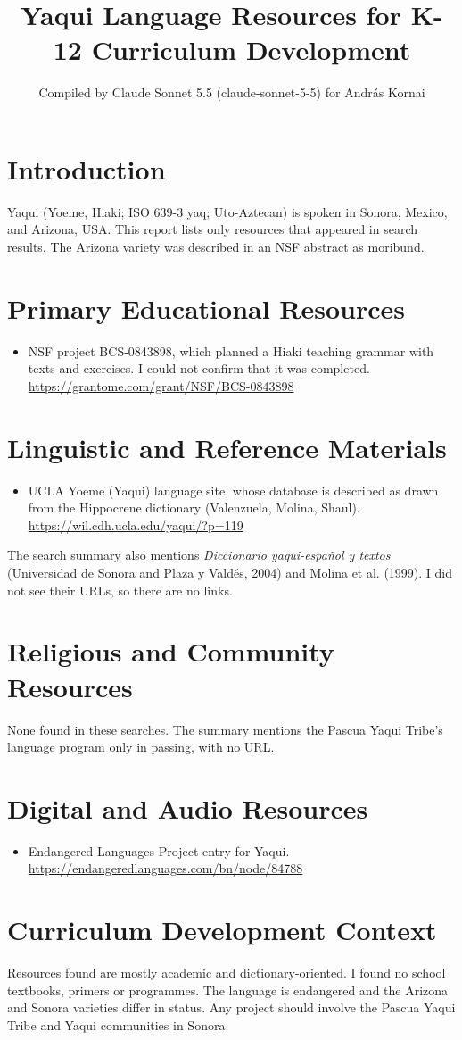 \documentclass[12pt]{article}
\title{Yaqui Language Resources for K-12 Curriculum Development}
\author{Compiled by Claude Sonnet 5.5 (claude-sonnet-5-5) for Andr\'as Kornai}
\date{}
\begin{document}
\maketitle

\section{Introduction}
Yaqui (Yoeme, Hiaki; ISO 639-3 yaq; Uto-Aztecan) is spoken in Sonora, Mexico, and Arizona, USA. This report lists only resources that appeared in search results. The Arizona variety was described in an NSF abstract as moribund.

\section{Primary Educational Resources}
\begin{itemize}
\item NSF project BCS-0843898, which planned a Hiaki teaching grammar with texts and exercises. I could not confirm that it was completed. \url{https://grantome.com/grant/NSF/BCS-0843898}
\end{itemize}

\section{Linguistic and Reference Materials}
\begin{itemize}
\item UCLA Yoeme (Yaqui) language site, whose database is described as drawn from the Hippocrene dictionary (Valenzuela, Molina, Shaul). \url{https://wil.cdh.ucla.edu/yaqui/?p=119}
\end{itemize}
The search summary also mentions \emph{Diccionario yaqui-espa\~nol y textos} (Universidad de Sonora and Plaza y Valdés, 2004) and Molina et al. (1999). I did not see their URLs, so there are no links.

\section{Religious and Community Resources}
None found in these searches. The summary mentions the Pascua Yaqui Tribe's language program only in passing, with no URL.

\section{Digital and Audio Resources}
\begin{itemize}
\item Endangered Languages Project entry for Yaqui. \url{https://endangeredlanguages.com/bn/node/84788}
\end{itemize}

\section{Curriculum Development Context}
Resources found are mostly academic and dictionary-oriented. I found no school textbooks, primers or programmes. The language is endangered and the Arizona and Sonora varieties differ in status. Any project should involve the Pascua Yaqui Tribe and Yaqui communities in Sonora.
\end{document}
